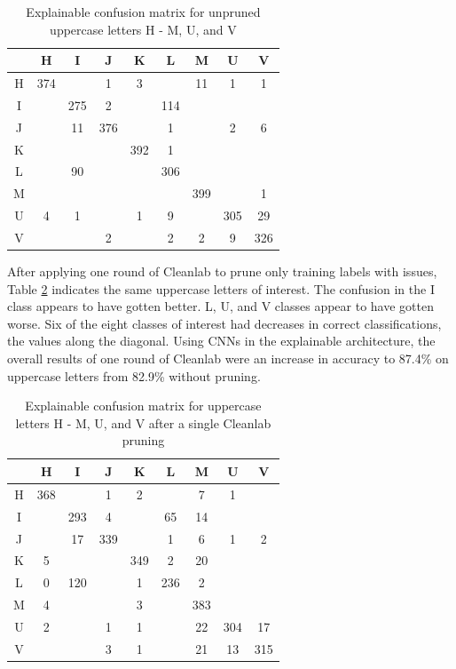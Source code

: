 \documentclass[conference]{IEEEtran}
\begin{document}
\begin{table}
    \centering
    \caption{Explainable confusion matrix for unpruned uppercase letters H - M, U, and V}
    \begin{tabular}{ |c|c|c|c|c|c|c|c|c|}
    \hline
     & H & I & J & K & L & M & U & V \\
    \hline
    H & 374 &  & 1 & 3 &  & 11 & 1 & 1 \\
    \hline
    I &  & 275 & 2 & & 114 & & & \\
    \hline
    J &  & 11 & 376 & & 1 & & 2 & 6 \\
    \hline
    K &  &  &  & 392 & 1 & & & \\
    \hline
    L &  & 90 &  &  & 306 & & & \\
    \hline
    M &  &  &  &  &  & 399 & & 1 \\
    \hline
    U & 4 & 1 & & 1 & 9 & & 305 & 29 \\
    \hline
    V & & & 2 & & 2 & 2 & 9 & 326 \\
    \hline
    \end{tabular}
    \label{raw_cap_confusion_matrix}
\end{table}

After applying one round of Cleanlab to prune only training labels with issues,
Table \ref{raw_cap_cleanlab_confusion_matrix} indicates the same uppercase
letters of interest. The confusion in the I class appears to have gotten better.
L, U, and V classes appear to have gotten worse. Six of the eight classes of
interest had decreases in correct classifications, the values along the
diagonal.  Using CNNs in the explainable architecture, the overall results of
one round of Cleanlab were an increase in accuracy to 87.4\% on uppercase
letters from 82.9\% without pruning.

\begin{table}
    \centering
    \caption{Explainable confusion matrix for uppercase letters H - M, U, and V after a single Cleanlab pruning}
    \begin{tabular}{ |c|c|c|c|c|c|c|c|c|}
    \hline
    ~ & H & I & J & K & L & M & U & V \\
    \hline
    H & 368 & & 1 & 2 & & 7 & 1 & \\
    \hline
    I &  & 293 & 4 &  & 65 & 14 & & \\
    \hline
    J & & 17 & 339 & & 1 & 6 & 1 & 2 \\
    \hline
    K & 5 &  &  & 349 & 2 & 20 &  & \\
    \hline
    L & 0 & 120 &  & 1 & 236 & 2 & & \\
    \hline
    M & 4 & & & 3 & & 383 & & \\
    \hline
    U & 2 & & 1 & 1 & & 22 & 304 & 17 \\
    \hline
    V & & & 3 & 1 & & 21 & 13 & 315 \\
    \hline
    \end{tabular}
    \label{raw_cap_cleanlab_confusion_matrix}
\end{table}
\end{document}
